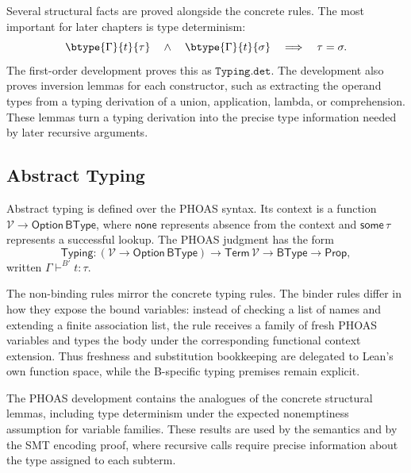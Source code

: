 Several structural facts are proved alongside the concrete rules.
The most important for later chapters is type determinism:
\[
  \btype{\Gamma}{t}{\tau}
  \quad\land\quad
  \btype{\Gamma}{t}{\sigma}
  \quad\Longrightarrow\quad
  \tau = \sigma.
\]
The first-order development proves this as \(\texttt{Typing.det}\).
The development also proves inversion lemmas for each constructor, such as
extracting the operand types from a typing derivation of a union, application,
lambda, or comprehension.
These lemmas turn a typing derivation into the precise type information needed
by later recursive arguments.

\subsection{Abstract Typing}
\label{subsec:b-abstract-typing}

Abstract typing is defined over the PHOAS syntax.
Its context is a function
\(\mathcal V \to \mathsf{Option}\,\mathsf{BType}\), where
\(\mathsf{none}\) represents absence from the context and
\(\mathsf{some}\,\tau\) represents a successful lookup.
The PHOAS judgment has the form
\[
  \mathsf{Typing} : (\mathcal V \to \mathsf{Option}\,\mathsf{BType})
  \to \mathsf{Term}\,\mathcal V \to \mathsf{BType} \to \mathsf{Prop},
\]
written \(\Gamma \vdash^{B'} t : \tau\).

The non-binding rules mirror the concrete typing rules.
The binder rules differ in how they expose the bound variables: instead of
checking a list of names and extending a finite association list, the rule
receives a family of fresh PHOAS variables and types the body under the
corresponding functional context extension.
Thus freshness and substitution bookkeeping are delegated to Lean's own
function space, while the B-specific typing premises remain explicit.

The PHOAS development contains the analogues of the concrete structural lemmas,
including type determinism under the expected nonemptiness assumption for
variable families.
These results are used by the semantics and by the SMT encoding proof, where
recursive calls require precise information about the type assigned to each
subterm.
